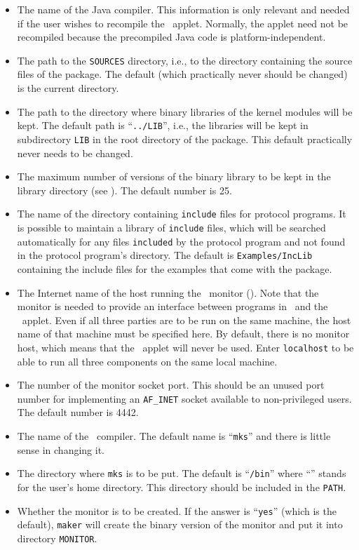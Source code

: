 \begin{itemize}
\item
The name of the Java compiler.
This information is only relevant and needed if the user
wishes to recompile the \dsd\ applet.
Normally, the applet need not be recompiled because the precompiled Java code
is platform-independent.
\item
The path to the {\tt SOURCES} directory, i.e., to the directory containing
the source files of the package.
The default (which practically never should be changed)
is the current directory.
\item
The path to the directory where binary libraries of the kernel modules
will be kept.
The default path is ``{\tt ../LIB}'', i.e., the libraries will be kept in
subdirectory {\tt LIB} in the root directory of the package.
This default practically never needs to be changed.
\item
The maximum number of versions of the binary library to be kept in the
library directory (see ).
The default number is 25.
\item
The name of the directory containing {\tt include} files for protocol
programs.
It is possible to maintain a library of {\tt include} files, which will be
searched automatically for any files {\tt included} by the protocol program
and not found in the protocol program's directory.
The default is {\tt Examples/IncLib} containing the include files for the
examples that come with the package.
\item
The Internet
name of the host running the \smurph\ monitor ().
Note that the monitor is needed to provide an interface between programs
in \smurph\ and the \dsd\ applet.
Even if all three parties are to be run on the same machine, the host name
of that machine must be specified here.
By default, there is no monitor host, which means that the \dsd\ applet
will never be used.
Enter {\tt localhost} to be able to
run all three components on the same local machine.
\item
The number of the monitor socket port.
This should be an unused port number for implementing an {\tt AF\_INET}
socket available to non-privileged users.
The default number is 4442.
\item
The name of the \smurph\ compiler.
The default name is ``{\tt mks}'' and there is little sense in changing it.
\item
The directory where {\tt mks} is to be put.
The default is ``{\tt {}/bin}'' where ``{\tt {}}'' stands for the
user's home directory.
This directory should be included in the {\tt PATH}.
\item
Whether the monitor is to be created.
If the answer is ``{\tt yes}'' (which is the default), {\tt maker} will create
the binary version of the monitor and put it into directory {\tt MONITOR}.
\end{itemize}

